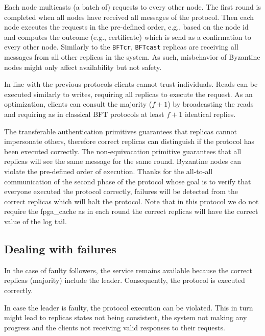   Each node multicasts (a batch of) requests to every other node. The first round is completed when all nodes have received all messages of the protocol. Then each node executes the requests in the pre-defined order, e.g., based on the node id and computes the outcome (e.g., certificate) which is send as a confirmation to every other node. Similarly to the \texttt{BFTcr}, \texttt{BFTcast} replicas are receiving all messages from all other replicas in the system. As such, misbehavior of Byzantine nodes might only affect availability but not safety.





 In line with the previous protocols clients cannot trust individuals. Reads can be executed similarly to writes, requiring all replicas to execute the request. As an optimization, clients can consult the majority ($f+1$) by broadcasting the reads and requiring as in classical BFT protocols at least $f+1$ identical replies.


 The transferable authentication primitives guarantees that replicas cannot impersonate others, therefore correct replicas can distinguish if the protocol has been executed correctly. The non-equivocation primitive guarantees that all replicas will see the same message for the same round. Byzantine nodes can violate the pre-defined order of execution. Thanks for the all-to-all communication of the second phase of the protocol whose goal is to verify that everyone executed the protocol correctly, failures will be detected from the correct replicas which will halt the protocol. Note that in this protocol we do not require the fpga\_cache as in each round the correct replicas will have the correct value of the log tail.

\subsection{Dealing with failures} In the case of faulty followers, the service remains available because the correct replicas (majority) include the leader. Consequently, the protocol is executed correctly.

In case the leader is faulty, the protocol execution can be violated. This in turn might lead to replicas states not being consistent, the system not making any progress and the clients not receiving valid responses to their requests. 

